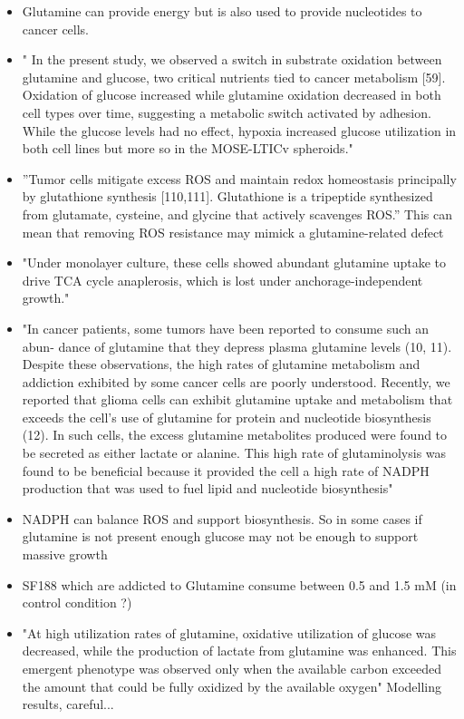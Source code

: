 \documentclass[11pt,a4paper]{article}
\begin{document}
\begin{itemize}
\item Glutamine can provide energy but is also used to provide nucleotides to cancer cells. \cite{Natarajan2019}\cite{Ma2022}
\item " In the present study, we observed a switch in substrate oxidation between glutamine and glucose, two critical nutrients tied to cancer metabolism [59]. Oxidation of glucose increased while glutamine oxidation decreased in both cell types over time, suggesting a metabolic switch activated by adhesion. While the glucose levels had no effect, hypoxia increased glucose utilization in both cell lines but more so in the MOSE-LTICv spheroids." \cite{Compton2022}
\item ”Tumor cells mitigate excess ROS and maintain redox homeostasis principally by
glutathione synthesis [110,111]. Glutathione is a tripeptide synthesized from glutamate,
cysteine, and glycine that actively scavenges ROS.”\cite{Natarajan2019} This can mean that removing ROS resistance may mimick a glutamine-related defect
\item "Under monolayer culture, these cells showed abundant glutamine uptake to drive TCA cycle anaplerosis, which is lost under anchorage-independent growth." \cite{Natarajan2019}
\item "In cancer patients, some tumors have been reported to consume such an abun-
dance of glutamine that they depress plasma glutamine levels (10, 11). Despite these
observations, the high rates of glutamine metabolism and addiction exhibited by some
cancer cells are poorly understood. Recently, we reported that glioma cells can exhibit
glutamine uptake and metabolism that exceeds the cell’s use of glutamine for protein and
nucleotide biosynthesis (12). In such cells, the excess glutamine metabolites produced
were found to be secreted as either lactate or alanine. This high rate of glutaminolysis
was found to be beneficial because it provided the cell a high rate of NADPH production
that was used to fuel lipid and nucleotide biosynthesis" \cite{Wise2008} 
\item NADPH can balance ROS and support biosynthesis. So in some cases if glutamine is not present enough glucose may not be enough to support massive growth
\item SF188 which are addicted to Glutamine consume between 0.5 and 1.5 mM (in control condition ?) \cite{Wise2008}
\item "At high utilization rates of glutamine, oxidative utilization of glucose was decreased, while the production of lactate from glutamine was enhanced. This emergent phenotype was observed only when the available carbon exceeded the amount that could be fully oxidized by the available oxygen" Modelling results, careful...\cite{Damiani2017}

\end{itemize}
\end{document}
